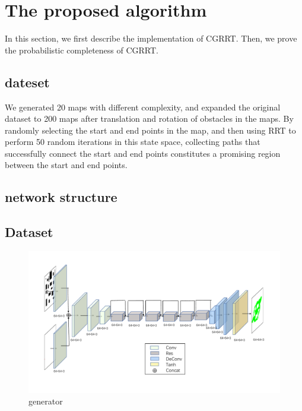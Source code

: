 \documentclass[smallcondensed]{svjour3}     %
\begin{document}
\section{The proposed algorithm}
In this section, we first describe the implementation of CGRRT.
Then, we prove the probabilistic completeness of CGRRT.

\subsection{dateset}
We generated 20 maps with different complexity, and expanded the original dataset to 200 maps after translation and rotation of obstacles in the maps. 
By randomly selecting the start and end points in the map, and then using RRT to perform 50 random iterations in this state space, collecting paths that successfully connect the start and end points constitutes a promising region between the start and end points.

\subsection{network structure}
\subsection{Dataset}
\begin{figure}
\centering
\includegraphics[scale=0.3]{network-CGGenerator.pdf}%
\caption{generator}     
\label{fig:generator}
\end{figure}
\end{document}
